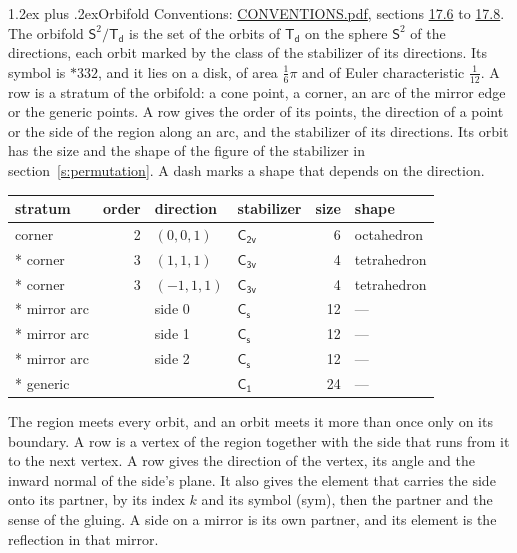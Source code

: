 \documentclass[10pt,a4paper]{article}
\makeatletter
\renewcommand\section{\@startsection{section}{1}{\z@}{-3ex plus -1ex minus -.2ex}%
  {1.2ex plus .2ex}{\normalfont\large\sffamily\bfseries\color{parttitle}}}
\numberwithin{equation}{section}
\newcommand{\grp}[1]{\mathsf{#1}}
\newcommand{\orbname}[1]{#1}
\newcommand{\dirvec}[3]{(#1, #2, #3)}
\newcommand{\twosphere}{\mathsf{S}^{2}}
\makeatother
\begin{document}
\section{Orbifold}\label{s:orbifold}
Conventions: \href{../../CONVENTIONS.pdf}{CONVENTIONS.pdf}, sections \href{../../CONVENTIONS.pdf\#conv.17.6}{17.6} to \href{../../CONVENTIONS.pdf\#conv.17.8}{17.8}.
The orbifold $\twosphere/\grp{T_{d}}$ is the set of the orbits of $\grp{T_{d}}$ on the sphere $\twosphere$ of the directions, each orbit marked by the class of the stabilizer of its directions. Its symbol is $\orbname{{\ast}332}$, and it lies on a disk, of area $\tfrac{1}{6}\pi$ and of Euler characteristic $\tfrac{1}{12}$.
\leavevmode\label{n:head.stratum}\label{n:head.order.point}\label{n:head.direction}\label{n:head.stabilizer}\label{n:head.size.orbit}\label{n:head.shape}A row is a stratum of the orbifold: a cone point, a corner, an arc of the mirror edge or the generic points. A row gives the order of its points, the direction of a point or the side of the region along an arc, and the stabilizer of its directions. Its orbit has the size and the shape of the figure of the stabilizer in section~\ref{s:permutation}. A dash marks a shape that depends on the direction.
{\small\setlength{\tabcolsep}{4pt}\begin{longtable}{@{}lrllrl@{}}\toprule
stratum & order & direction & stabilizer & size & shape\\\midrule\endhead
\bottomrule\endfoot\endlastfoot
corner & 2 & $\dirvec{0}{0}{1}$ & \href{C2v.pdf}{$\grp{C_{2v}}$} & 6 & octahedron\\*
corner & 3 & $\dirvec{1}{1}{1}$ & \href{C3v.pdf}{$\grp{C_{3v}}$} & 4 & tetrahedron\\*
corner & 3 & $\dirvec{-1}{1}{1}$ & \href{C3v.pdf}{$\grp{C_{3v}}$} & 4 & tetrahedron\\*
mirror arc &  & side 0 & \href{C1v.pdf}{$\grp{C_{s}}$} & 12 & ---\\*
mirror arc &  & side 1 & \href{C1v.pdf}{$\grp{C_{s}}$} & 12 & ---\\*
mirror arc &  & side 2 & \href{C1v.pdf}{$\grp{C_{s}}$} & 12 & ---\\*
generic &  &  & \href{C1.pdf}{$\grp{C_{1}}$} & 24 & ---\\
\bottomrule\end{longtable}}
\leavevmode\label{n:head.vertex.region}\label{n:head.angle}\label{n:head.normal.side}\label{n:head.partner}\label{n:head.sense}The region meets every orbit, and an orbit meets it more than once only on its boundary. A row is a vertex of the region together with the side that runs from it to the next vertex. A row gives the direction of the vertex, its angle and the inward normal of the side's plane. It also gives the element that carries the side onto its partner, by its index $k$ and its symbol (sym), then the partner and the sense of the gluing. A side on a mirror is its own partner, and its element is the reflection in that mirror.
\end{document}
